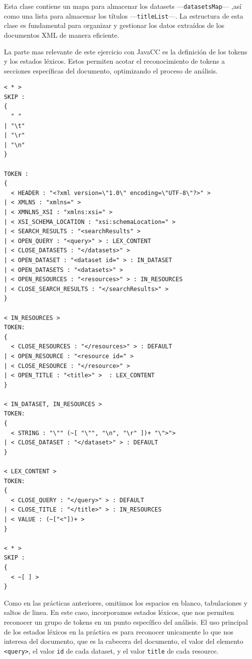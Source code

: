 Esta clase contiene un mapa para almacenar los datasets ---\lstinline|datasetsMap|---%
,así como
una lista para almacenar los títulos ---\lstinline|titleList|---. La estructura de esta clase es fundamental para organizar y gestionar los datos extraídos de los documentos XML de manera eficiente.

La parte mas relevante de este ejercicio con JavaCC es la definición de los tokens y los estados léxicos. Estos permiten acotar el reconocimiento de tokens a secciones específicas del documento, optimizando el proceso de análisis.

\lstset{inputencoding=utf8/latin1}
\begin{lstlisting}
< * >
SKIP :
{
  " " 
| "\t"
| "\r"
| "\n"
} 

TOKEN :
{
  < HEADER : "<?xml version=\"1.0\" encoding=\"UTF-8\"?>" > 
| < XMLNS : "xmlns=" > 
| < XMNLNS_XSI : "xmlns:xsi=" > 
| < XSI_SCHEMA_LOCATION : "xsi:schemaLocation=" > 
| < SEARCH_RESULTS : "<searchResults" >
| < OPEN_QUERY : "<query>" > : LEX_CONTENT
| < CLOSE_DATASETS : "</datasets>" > 
| < OPEN_DATASET : "<dataset id=" > : IN_DATASET
| < OPEN_DATASETS : "<datasets>" > 
| < OPEN_RESOURCES : "<resources>" > : IN_RESOURCES
| < CLOSE_SEARCH_RESULTS : "</searchResults>" >
}

< IN_RESOURCES >
TOKEN:
{
  < CLOSE_RESOURCES : "</resources>" > : DEFAULT
| < OPEN_RESOURCE : "<resource id=" > 
| < CLOSE_RESOURCE : "</resource>" > 
| < OPEN_TITLE : "<title>" >  : LEX_CONTENT
}

< IN_DATASET, IN_RESOURCES >
TOKEN:
{
  < STRING : "\"" (~[ "\"", "\n", "\r" ])+ "\">">
| < CLOSE_DATASET : "</dataset>" > : DEFAULT
}

< LEX_CONTENT >
TOKEN:
{
  < CLOSE_QUERY : "</query>" > : DEFAULT
| < CLOSE_TITLE : "</title>" > : IN_RESOURCES
| < VALUE : (~["<"])+ > 
}

< * >
SKIP :
{
  < ~[ ] >
}
\end{lstlisting}

Como en las prácticas anteriores, omitimos los espacios en blanco, tabulaciones y saltos de linea. En este caso, incorporamos estados léxicos, que nos permiten reconocer un grupo de tokens en un punto específico del análisis. 
El uso principal de los estados léxicos en la práctica es para reconocer unicamente lo que nos interesa del documento, que es la cabecera del documento, el valor del elemento \lstinline|<query>|, el valor \lstinline|id| de cada dataset, y el valor \lstinline|title| de cada resource. 

